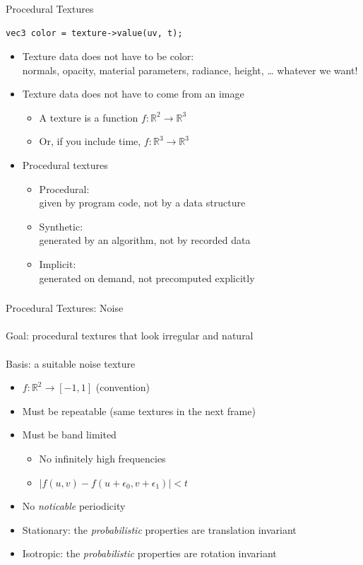 \documentclass[utf8,stillsansserifmath,fleqn,t]{beamer}
\begin{document}
\begin{frame}[fragile,label=texture-procedural-intro]
\frametitle{\insertsection}
Procedural Textures
\begin{lstlisting}
vec3 color = texture->value(uv, t);
\end{lstlisting}
\begin{itemize}
\item Texture data does not have to be color:\\
    normals, opacity, material parameters, radiance, height, \ldots{} whatever we want!
\item Texture data does not have to come from an image
    \begin{itemize}
    \item A texture is a function $f: \mathbb{R}^2 \rightarrow \mathbb{R}^3$
    \item Or, if you include time, $f: \mathbb{R}^3 \rightarrow \mathbb{R}^3$
    \end{itemize}
\item Procedural textures
    \begin{itemize}
    \item Procedural:\\ given by program code, not by a data structure
    \item Synthetic:\\ generated by an algorithm, not by recorded data
    \item Implicit:\\ generated on demand, not precomputed explicitly
    \end{itemize}
\end{itemize}
\end{frame}

\begin{frame}[label=noise-1]
\frametitle{\insertsection}
Procedural Textures: Noise\\~\\
Goal: procedural textures that look irregular and natural\\~\\
Basis: a suitable noise texture
\begin{itemize}
\item $f: \mathbb{R}^2 \rightarrow [-1,1]$ (convention)
\item Must be repeatable (same textures in the next frame)
\item Must be band limited
    \begin{itemize}
    \item No infinitely high frequencies
    \item $|f(u,v)-f(u+\epsilon_0,v+\epsilon_1)| < t$
    \end{itemize}
\item No \emph{noticable} periodicity
\item Stationary: the \emph{probabilistic} properties are translation invariant
\item Isotropic: the \emph{probabilistic} properties are rotation invariant
\end{itemize}
\end{frame}
\end{document}
